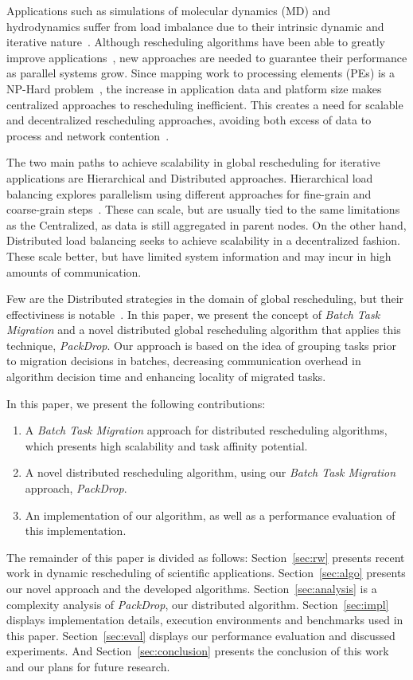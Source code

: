 Applications such as simulations of molecular dynamics (MD) and hydrodynamics suffer from load imbalance due to their intrinsic dynamic and iterative nature~\cite{namd,IPDPS13:LULESH}.
Although rescheduling algorithms have been able to greatly improve applications~\cite{namd0}, new approaches are needed to guarantee their performance as parallel systems grow.
Since mapping work to processing elements (PEs) is a NP-Hard problem~\cite{npcomplete}, the increase in application data and platform size makes centralized approaches to rescheduling inefficient.
This creates a need for scalable and decentralized rescheduling approaches, avoiding both excess of data to process and network contention~\cite{trahay2009scalable}.

The two main paths to achieve scalability in global rescheduling for iterative applications are Hierarchical and Distributed approaches.
Hierarchical load balancing explores parallelism using different approaches for fine-grain and coarse-grain steps~\cite{hybrid}.
These can scale, but are usually tied to the same limitations as the Centralized, as data is still aggregated in parent nodes.
On the other hand, Distributed load balancing seeks to achieve scalability in a decentralized fashion.
These scale better, but have limited system information and may incur in high amounts of communication.

Few are the Distributed strategies in the domain of global rescheduling, but their effectiviness is notable~\cite{grapevine,diffus}.
In this paper, we present the concept of \textit{Batch Task Migration} and a novel distributed global rescheduling algorithm that applies this technique, \textit{PackDrop}.
Our approach is based on the idea of grouping tasks prior to migration decisions in batches, decreasing communication overhead in algorithm decision time and enhancing locality of migrated tasks.

In this paper, we present the following contributions: 
\begin{enumerate}
	\item A \textit{Batch Task Migration} approach for distributed rescheduling algorithms, which presents high scalability and task affinity potential.
	\item A novel distributed rescheduling algorithm, using our \textit{Batch Task Migration} approach, \textit{PackDrop}.
	\item An implementation of our algorithm, as well as a performance evaluation of this implementation.
\end{enumerate}

The remainder of this paper is divided as follows:
Section~\ref{sec:rw} presents recent work in dynamic rescheduling of scientific applications. 
Section~\ref{sec:algo} presents our novel approach and the developed algorithms. 
Section~\ref{sec:analysis} is a complexity analysis of \textit{PackDrop}, our distributed algorithm. 
Section~\ref{sec:impl} displays implementation details, execution environments and benchmarks used in this paper. 
Section~\ref{sec:eval} displays our performance evaluation and discussed experiments. 
And Section~\ref{sec:conclusion} presents the conclusion of this work and our plans for future research.


